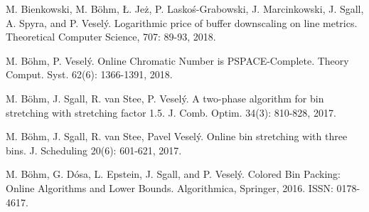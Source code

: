 \begingroup
\let\clearpage\relax
\let\chapter\paragraph
\renewcommand\bibname{Journal papers}
\begin{thebibliography}{99}
\setlength\itemsep{0pt}

M. Bienkowski, M. Böhm, Ł. Jeż, P. Laskoś-Grabowski, J. Marcinkowski, J. Sgall, A. Spyra, and P. Veselý.
\newblock Logarithmic price of buffer downscaling on line metrics.
\newblock Theoretical Computer Science, 707: 89-93, 2018.

M. Böhm, P. Veselý.
\newblock Online Chromatic Number is PSPACE-Complete.
\newblock Theory Comput. Syst. 62(6): 1366-1391, 2018.

M. Böhm, J. Sgall, R. van Stee, P. Veselý.
\newblock A two-phase algorithm for bin stretching with stretching factor 1.5.
\newblock J. Comb. Optim. 34(3): 810-828, 2017.

M. Böhm, J. Sgall, R. van Stee, Pavel Veselý.
\newblock Online bin stretching with three bins.
\newblock J. Scheduling 20(6): 601-621, 2017.

M. Böhm, G. Dósa, L. Epstein, J. Sgall, and P. Veselý.
\newblock Colored Bin Packing: Online Algorithms and Lower Bounds.
\newblock Algorithmica, Springer, 2016.
\newblock ISSN: 0178-4617.


\end{thebibliography}

